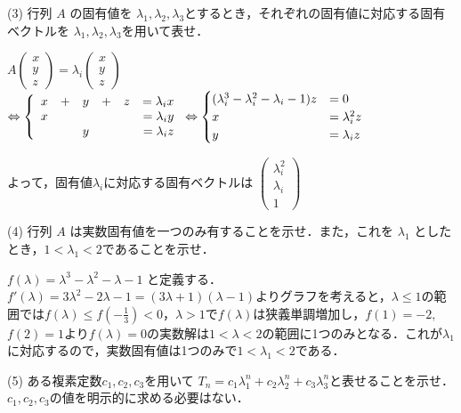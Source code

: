 \documentclass[a4j]{jarticle}
\let \ds \displaystyle
\begin{document}
\begin{screen}
 (3) 行列 $A$ の固有値を $\lambda_1,\lambda_2,\lambda_3$とするとき，それぞれの固有値に対応する固有ベクトルを $\lambda_1,\lambda_2,\lambda_3$を用いて表せ．
\end{screen}

$\ds A \begin{pmatrix} x\\ y \\ z\end{pmatrix} = \lambda_i\begin{pmatrix} x\\ y \\ z\end{pmatrix}$
$\ds \Leftrightarrow
\left\{
\begin{array}[tb]{rrrrrr}
 x&+&y&+&z&=\lambda_i x \\
 x& & & & &=\lambda_i y \\
  & &y& & &=\lambda_i z \\
\end{array}
\right.
\Leftrightarrow
\begin{cases}
 (\lambda_i^3 - \lambda_i^2 - \lambda_i - 1)z &= 0 \\
 x &= \lambda_i^2 z \\
 y &= \lambda_i   z
\end{cases}
$

よって，固有値$\lambda_i$に対応する固有ベクトルは $\begin{pmatrix} \lambda_i^2\\ \lambda_i \\ 1\end{pmatrix}$
\begin{screen}
 (4) 行列 $A$ は実数固有値を一つのみ有することを示せ．また，これを $\lambda_1$ としたとき，$1<\lambda_1<2$であることを示せ．
\end{screen}

$f(\lambda)=\lambda^3-\lambda^2-\lambda-1$ と定義する．$f'(\lambda)=3\lambda^2-2\lambda-1=(3\lambda+1)(\lambda-1)$よりグラフを考えると，$\lambda \leq 1$の範囲では$f(\lambda)\leq f(-\frac{1}{3}) < 0$，$\lambda>1$で$f(\lambda)$は狭義単調増加し，$f(1)=-2,$ $f(2)=1$より$f(\lambda)=0$の実数解は$1<\lambda<2$の範囲に1つのみとなる．これが$\lambda_1$に対応するので，実数固有値は1つのみで$1<\lambda_1<2$である．

\begin{screen}
 (5) ある複素定数$c_1,c_2,c_3$を用いて $T_n = c_1\lambda_1^n+c_2\lambda_2^n+c_3\lambda_3^n$と表せることを示せ．$c_1,c_2,c_3$の値を明示的に求める必要はない．
\end{screen}
\end{document}
